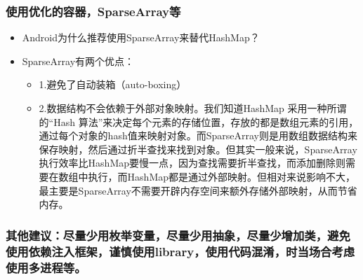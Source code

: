 \documentclass[9pt, b5paper]{article}
\begin{document}
\subsubsection{使用优化的容器，SparseArray等}
\label{sec-1-1-5}
\begin{itemize}
\item Android为什么推荐使用SparseArray来替代HashMap？
\item SparseArray有两个优点：
\begin{itemize}
\item 1.避免了自动装箱（auto-boxing）
\item 2.数据结构不会依赖于外部对象映射。我们知道HashMap 采用一种所谓的“Hash 算法”来决定每个元素的存储位置，存放的都是数组元素的引用，通过每个对象的hash值来映射对象。而SparseArray则是用数组数据结构来保存映射，然后通过折半查找来找到对象。但其实一般来说，SparseArray执行效率比HashMap要慢一点，因为查找需要折半查找，而添加删除则需要在数组中执行，而HashMap都是通过外部映射。但相对来说影响不大，最主要是SparseArray不需要开辟内存空间来额外存储外部映射，从而节省内存。
\end{itemize}
\end{itemize}
\subsubsection{其他建议：尽量少用枚举变量，尽量少用抽象，尽量少增加类，避免使用依赖注入框架，谨慎使用library，使用代码混淆，时当场合考虑使用多进程等。}
\label{sec-1-1-6}
\end{document}
